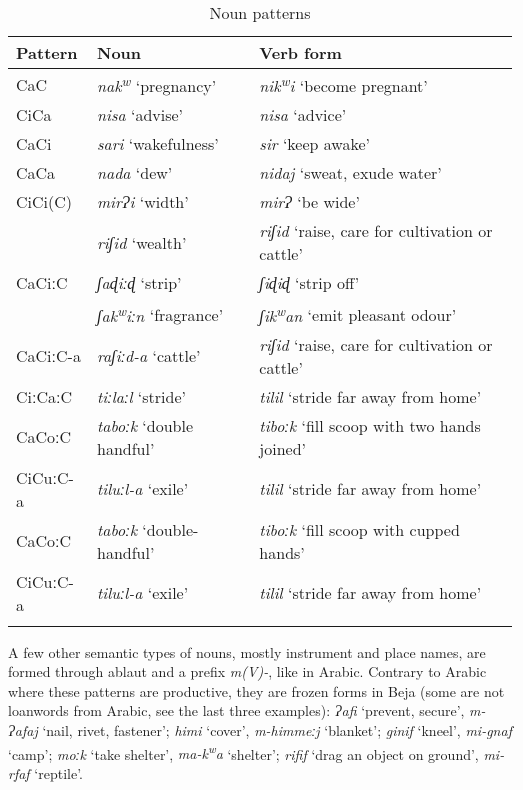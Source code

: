 \documentclass[output=paper]{langsci/langscibook}
\begin{document}
\begin{table}
\begin{tabularx}{\textwidth}{llQ}
\lsptoprule
Pattern & Noun & Verb form\\
\midrule
CaC & \textit{nak\textsuperscript{w}} ‘pregnancy’ & \textit{nik\textsuperscript{w}}\textit{i} ‘become pregnant’\\
CiCa & \textit{nisa} ‘advise’ & \textit{nisa} ‘advice’\\
CaCi & \textit{sari} ‘wakefulness’ & \textit{sir} ‘keep awake’\\
CaCa & \textit{nada} ‘dew’ & \textit{nidaj} ‘sweat, exude water’\\
CiCi(C) & \textit{mirɁi} ‘width’ & \textit{mirɁ} ‘be wide’\\
& \textit{riʃid} ‘wealth’ & \textit{riʃid} ‘raise, care for cultivation or cattle’\\
CaCiːC & \textit{ʃaɖiːɖ} ‘strip’ & \textit{ʃiɖiɖ} ‘strip off’\\
& \textit{ʃak\textsuperscript{w}}\textit{iːn} ‘fragrance’ & \textit{ʃik\textsuperscript{w}}\textit{an} ‘emit pleasant odour’\\
CaCiːC-a & \textit{raʃiːd-a} ‘cattle’ & \textit{riʃid} ‘raise, care for cultivation or cattle’\\
CiːCaːC & \textit{tiːlaːl} ‘stride’ & \textit{tilil} ‘stride far away from home’\\
CaCoːC & \textit{taboːk} ‘double handful’ & \textit{tiboːk} ‘fill scoop with two hands joined’\\
CiCuːC-a & \textit{tiluːl-a} ‘exile’ & \textit{tilil} ‘stride far away from home’\\
CaCoːC & \textit{taboːk} ‘double-handful’ & \textit{tiboːk} ‘fill scoop with cupped hands’\\
CiCuːC-a & \textit{tiluːl-a} ‘exile’ & \textit{tilil} ‘stride far away from home’\\
\lspbottomrule
\end{tabularx} 
\caption{Noun patterns}
\label{tab:vanhove:nounpat}
\end{table}


 
 
 




A few other semantic types of nouns, mostly instrument and place names, are formed through ablaut and a prefix \textit{m(V)-}, like in Arabic. Contrary to Arabic where these patterns are productive, they are frozen forms in Beja (some are not loanwords from Arabic, see the last three examples): \textit{Ɂafi} ‘prevent, secure’, \textit{m\nobreakdash-Ɂafaj} ‘nail, rivet, fastener’; \textit{himi} ‘cover’, \textit{m-himmeːj} ‘blanket’; \textit{ginif} ‘kneel’, \textit{mi-gnaf} ‘camp’; \textit{moːk} ‘take shelter’, \textit{ma\nobreakdash-k\textsuperscript{w}}\textit{a} ‘shelter’; \textit{rifif} ‘drag an object on ground’, \textit{mi-rfaf} ‘reptile’.
\end{document}
